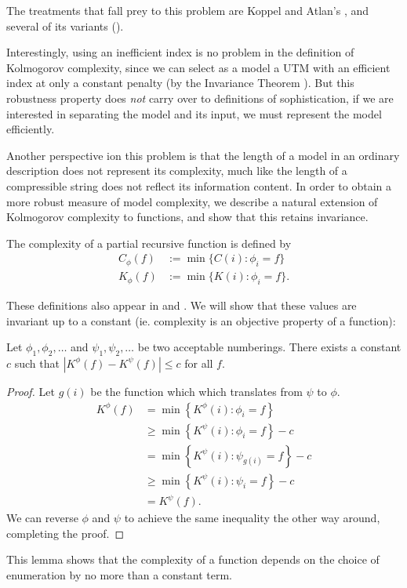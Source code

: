 \documentclass{style/llncs}
\begin{document}
The treatments that fall prey to this problem are Koppel and Atlan's \cite{koppelSoph1988,koppel1991almost},  and several of its variants (\cite{antunes2009sophistication,antunes2013sophistication}). 

Interestingly, using an inefficient index is no problem in the definition of Kolmogorov complexity, since we can select as a model a UTM with an efficient index at only a constant penalty (by the Invariance Theorem \cite{li1993introduction}). But this robustness property does \emph{not} carry over to definitions of sophistication, if we are interested in separating the model and its input, we must represent the model efficiently. 

Another perspective ion this problem is that the length of a model in an ordinary description does not represent its complexity, much like the length of a compressible string does not reflect its information content. In order to obtain a more robust measure of model complexity, we describe a natural extension of Kolmogorov complexity to functions, and show that this retains invariance.

\begin{definition}
  The complexity of a partial recursive function is defined by
  \begin{align*}
    C_\phi(f) &:= \min\{C(i):\phi_i=f\}\\
    K_\phi(f) &:= \min\{K(i):\phi_i=f\}.
  \end{align*} \label{definition:model-complexity}
\end{definition}
These definitions also appear in \cite{grunwald2004shannon} and \cite{vitanyi2004meaningful}. We will show that these values are invariant up to a constant (ie. complexity is an objective property of a function):
\begin{lemma}[Invariance]
Let $\phi_1, \phi_2, \ldots$ and $\psi_1, \psi_2,\ldots$ be two acceptable numberings. There exists a constant $c$ such that $\left| K^\phi(f) - K^\psi(f)\right | \leq c$ for all $f$. \label{lemma:invariance}
\end{lemma}
\begin{proof}
Let $g(i)$ be the function which which translates from $\psi$ to $\phi$.
\begin{align*}
K^\phi(f) &= \min\left\{ K^\phi(i) : \phi_i= f\right\} \\
&\geq \min\left\{ K^\psi(i) : \phi_i= f\right\} - c\\
&= \min\left\{ K^\psi(i) : \psi_{g(i)}= f\right\} - c\\
&\geq \min\left\{ K^\psi(i) : \psi_i= f\right\} - c\\
&= K^\psi(f).
\end{align*}
We can reverse $\phi$ and $\psi$ to achieve the same inequality the other way around, completing the proof.
\end{proof}
This lemma shows that the complexity of a function depends on the choice of
enumeration by no more than a constant term.
\end{document}
